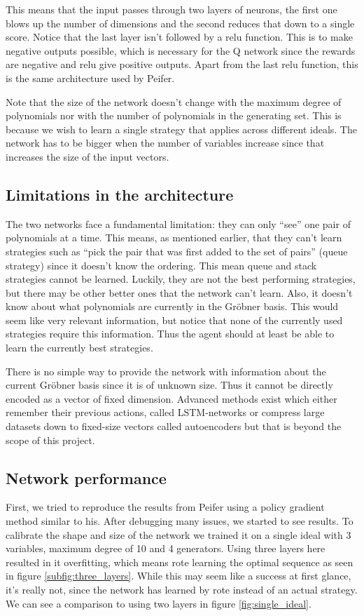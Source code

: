 \documentclass{article}
\theoremstyle{changedot}
\theoremstyle{changedotbreak}
\theoremstyle{nonumberplain}
\begin{document}
This means that the input passes through two layers of neurons, the first one blows up the number of dimensions and the second reduces that down to a single score. Notice that the last layer isn't followed by a relu function. This is to make negative outputs possible, which is necessary for the Q network since the rewards are negative and relu give positive outputs. Apart from the last relu function, this is the same architecture used by Peifer.

Note that the size of the network doesn't change with the maximum degree of polynomials nor with the number of polynomials in the generating set. This is because we wish to learn a single strategy that applies across different ideals. The network has to be bigger when the number of variables increase since that increases the size of the input vectors.

\subsection{Limitations in the architecture}\label{sec:limits}
The two networks face a fundamental limitation: they can only ``see'' one pair of polynomials at a time. This means, as mentioned earlier, that they can't learn strategies such as ``pick the pair that was first added to the set of pairs'' (queue strategy) since it doesn't know the ordering. This mean queue and stack strategies cannot be learned. Luckily, they are not the best performing strategies, but there may be other better ones that the network can't learn. Also, it doesn't know about what polynomials are currently in the Gröbner basis. This would seem like very relevant information, but notice that none of the currently used strategies require this information. Thus the agent should at least be able to learn the currently best strategies.

 There is no simple way to provide the network with information about the current Gröbner basis since it is of unknown size. Thus it cannot be directly encoded as a vector of fixed dimension. Advanced methods exist which either remember their previous actions, called LSTM-networks \cite{LSTM} or compress large datasets down to fixed-size vectors called autoencoders \cite{autoencoder} but that is beyond the scope of this project.

\subsection{Network performance}
First, we tried to reproduce the results from Peifer \cite{peifer} using a policy gradient method similar to his. After debugging many issues, we started to see results. To calibrate the shape and size of the network we trained it on a single ideal with 3 variables, maximum degree of 10 and 4 generators. Using three layers here resulted in it overfitting, which means rote learning the optimal sequence as seen in figure \ref{subfig:three_layers}. While this may seem like a success at first glance, it's really not, since the network has learned by rote instead of an actual strategy. We can see a comparison to using two layers in figure \ref{fig:single_ideal}.
\end{document}
